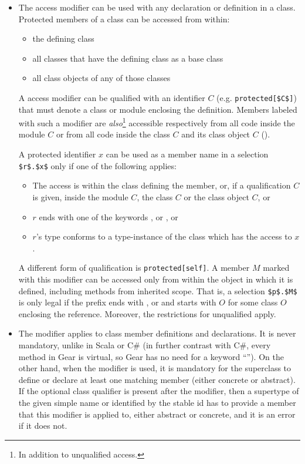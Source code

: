 \begin{itemize}
  \item The  access modifier can be used with any declaration or definition in a class. Protected members of a class can be accessed from within: 
  \begin{itemize}
    \item the defining class
    \item all classes that have the defining class as a base class
    \item all class objects of any of those classes
  \end{itemize}

  A  access modifier can be qualified with an identifier $C$ (e.g. \lstinline!protected[$C$]!) that must denote a class or module enclosing the definition. Members labeled with such a modifier are {\em also}\footnote{In addition to unqualified  access.} accessible respectively from all code inside the module $C$ or from all code inside the class $C$ and its class object $C$ (). 

  A protected identifier $x$ can be used as a member name in a selection \lstinline!$r$.$x$! only if one of the following applies: 
  \begin{itemize}
    \item The access is within the class defining the member, or, if a qualification $C$ is given, inside the module $C$, the class $C$ or the class object $C$, or
    \item $r$ ends with one of the keywords ,  or , or
    \item $r$'s type conforms to a type-instance of the class which has the access to $x$. 
  \end{itemize}

  A different form of qualification is \lstinline!protected[self]!. A member $M$ marked with this modifier can be accessed only from within the object in which it is defined, including methods from inherited scope. That is, a selection \lstinline!$p$.$M$! is only legal if the prefix ends with ,  or  and starts with $O$ for some class $O$ enclosing the reference. Moreover, the restrictions for unqualified  apply. 

  \item The  modifier applies to class member definitions and declarations. It is never mandatory, unlike in Scala or C\# (in further contrast with C\#, every method in Gear is virtual, so Gear has no need for a keyword ``''). On the other hand, when the modifier is used, it is mandatory for the superclass to define or declare at least one matching member (either concrete or abstract). If the optional class qualifier is present after the  modifier, then a supertype of the given simple name or identified by the stable id has to provide a member that this modifier is applied to, either abstract or concrete, and it is an error if it does not. 


\end{itemize}
